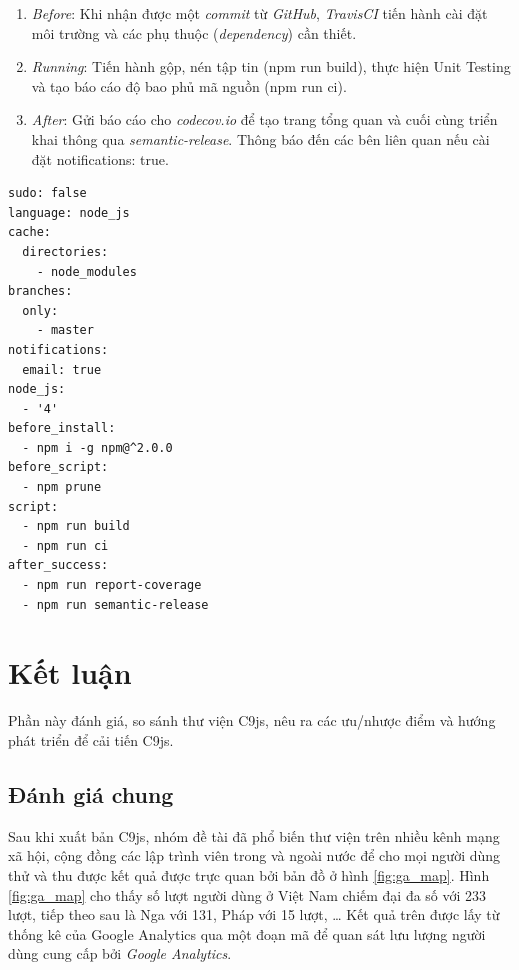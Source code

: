 \documentclass[12pt,a4paper,twoside]{article}
\begin{document}
\begin{enumerate}
\item \emph{Before}: Khi nhận được một \textit{commit} từ \textit{GitHub}, \textit{TravisCI} tiến hành cài đặt môi trường và các phụ thuộc (\textit{dependency}) cần thiết.
\item \emph{Running}: Tiến hành gộp, nén tập tin (\textsf{npm run build}), thực hiện Unit Testing và tạo báo cáo độ bao phủ mã nguồn (\textsf{npm run ci}).
\item \emph{After}: Gửi báo cáo cho \textit{codecov.io} để tạo trang tổng quan và cuối cùng triển khai thông qua \textit{semantic-release}. Thông báo đến các bên liên quan nếu cài đặt \textsf{notifications: true}.
\end{enumerate}

\begin{lstlisting}[caption=Cấu hình TravisCI kiểm soát cả 3 giai đoạn,label={code:travisci}]
sudo: false
language: node_js
cache:
  directories:
    - node_modules
branches:
  only:
    - master
notifications:
  email: true
node_js:
  - '4'
before_install:
  - npm i -g npm@^2.0.0
before_script:
  - npm prune
script:
  - npm run build
  - npm run ci
after_success:
  - npm run report-coverage
  - npm run semantic-release
\end{lstlisting}

\clearpage
\section{Kết luận}
Phần này đánh giá, so sánh thư viện C9js, nêu ra các ưu/nhược điểm và hướng phát triển để cải tiến C9js.
\subsection{Đánh giá chung}\label{sec:eval}
Sau khi xuất bản C9js, nhóm đề tài đã phổ biến thư viện trên nhiều kênh mạng xã hội, cộng đồng các lập trình viên trong và ngoài nước để cho mọi người dùng thử và thu được kết quả được trực quan bởi bản đồ ở hình \ref{fig:ga_map}. Hình \ref{fig:ga_map} cho thấy số lượt người dùng ở Việt Nam chiếm đại đa số với 233 lượt, tiếp theo sau là Nga với 131, Pháp với 15 lượt, … Kết quả trên được lấy từ thống kê của Google Analytics qua một đoạn mã để quan sát lưu lượng người dùng cung cấp bởi \textit{Google Analytics}\cite{ga_c9js}.
\end{document}
